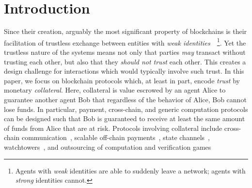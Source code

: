 \documentclass[runningheads]{llncs}
\newcommand{\dom}[1]{\todo[linecolor=green,backgroundcolor=green!25,bordercolor=green,inline,caption={}]{Comment by Dominik: #1}}
\begin{document}

\section{Introduction}
\label{sec:intro}


Since their creation, arguably the most significant property of blockchains is their facilitation of trustless exchange between entities with \emph{weak identities}~\cite{rainer}~\footnote{Agents with \emph{weak} identities are able to suddenly leave a network; agents with \emph{strong} identities cannot.}.
Yet the trustless nature of the systems means not only that parties \textit{may} transact without trusting each other, but also that they \textit{should not trust} each other.
This creates a design challenge for interactions which would typically involve such trust. 
In this paper, we focus on blockchain protocols which, at least in part, encode \textit{trust} by monetary \textit{collateral}.
Here, collateral is value escrowed by an agent Alice to guarantee another agent Bob that regardless of the behavior of Alice, Bob cannot lose funds. 
In particular, payment, cross-chain, and generic computation protocols can be designed such that Bob is guaranteed to receive at least the same amount of funds from Alice that are at risk.
Protocols involving collateral include cross-chain communication~\cite{Zamyatin2019XCLAIM}, scalable off-chain payments~\cite{Khalil2019NOCUST}, state channels~\cite{dziembowski2018general}, watchtowers~\cite{mccorry2018pisa,avarikioti2019brick,avarikioti2018towards}, and outsourcing of computation and verification games~\cite{teutsch2017scalable}
\end{document}
